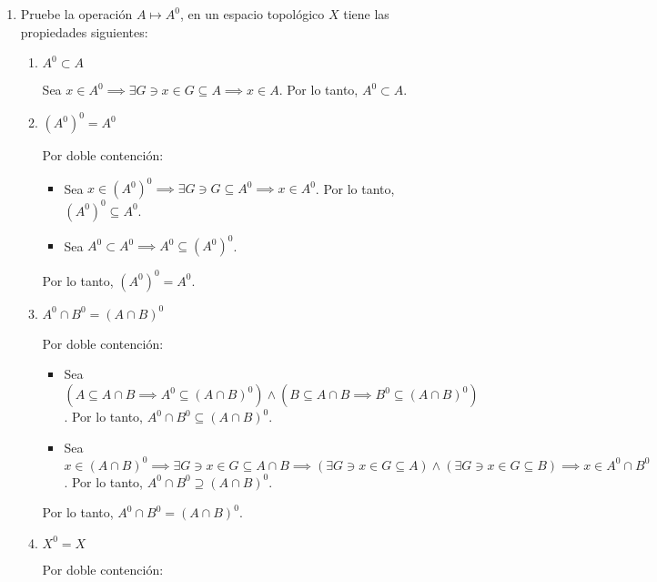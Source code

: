 \begin{problema}
    \begin{enumerate}
        \item Pruebe la operación $A \mapsto A^0$, en un espacio topológico $X$ tiene las propiedades siguientes:
        \begin{enumerate}
            \item $A^0 \subset A$
            \begin{dem}
                Sea $x\in A^0\implies \exists G\ni x\in G\subseteq A\implies x\in A$. Por lo tanto, $A^0\subset A$.
            \end{dem}
            \item $\left(A^0\right)^0=A^0$
            \begin{dem}
                Por doble contención: 
                \begin{itemize}
                    \item Sea $x\in \left(A^0\right)^0\implies \exists G\ni G\subseteq A^0\implies x\in A^0$. Por lo tanto, $\left(A^0\right)^0\subseteq A^0$.
                    \item Sea $A^0\subset A^0\implies A^0\subseteq (A^0)^0$.
                \end{itemize}
                Por lo tanto, $\left(A^0\right)^0=A^0$.
            \end{dem}
            \item $A^0 \cap B^0=(A \cap B)^0$
            \begin{dem}
                Por doble contención: 
                \begin{itemize}
                    \item Sea $(A\subseteq A\cap B\implies A^0\subseteq (A\cap B)^0)\wedge (B\subseteq A\cap B\implies B^0\subseteq (A\cap B)^0)$. Por lo tanto, $A^0 \cap B^0\subseteq(A \cap B)^0$.
                    \item Sea $x\in (A \cap B)^0\implies \exists G\ni x\in G\subseteq A\cap B\implies (\exists G\ni x\in G\subseteq A)\wedge(\exists G\ni x\in G\subseteq B)\implies x\in A^0\cap B^0$. Por lo tanto, $A^0 \cap B^0\supseteq (A \cap B)^0$.
                \end{itemize}
                Por lo tanto, $A^0 \cap B^0=(A \cap B)^0$.
            \end{dem}
            \item $X^0=X$
            \begin{dem}
                Por doble contención: 
                \begin{itemize}

\end{itemize}
\end{dem}
\end{enumerate}
\end{enumerate}
\end{problema}
